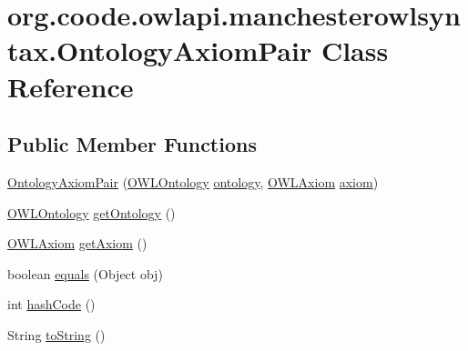 \hypertarget{classorg_1_1coode_1_1owlapi_1_1manchesterowlsyntax_1_1_ontology_axiom_pair}{\section{org.\-coode.\-owlapi.\-manchesterowlsyntax.\-Ontology\-Axiom\-Pair Class Reference}
\label{classorg_1_1coode_1_1owlapi_1_1manchesterowlsyntax_1_1_ontology_axiom_pair}
}
\subsection*{Public Member Functions}
\begin{DoxyCompactItemize}
\item 
\hyperlink{classorg_1_1coode_1_1owlapi_1_1manchesterowlsyntax_1_1_ontology_axiom_pair_af0f8243c91b25e613c98828ea98b0e15}{Ontology\-Axiom\-Pair} (\hyperlink{interfaceorg_1_1semanticweb_1_1owlapi_1_1model_1_1_o_w_l_ontology}{O\-W\-L\-Ontology} \hyperlink{classorg_1_1coode_1_1owlapi_1_1manchesterowlsyntax_1_1_ontology_axiom_pair_ace199db27dc5c7c8914a8433ce7f4bac}{ontology}, \hyperlink{interfaceorg_1_1semanticweb_1_1owlapi_1_1model_1_1_o_w_l_axiom}{O\-W\-L\-Axiom} \hyperlink{classorg_1_1coode_1_1owlapi_1_1manchesterowlsyntax_1_1_ontology_axiom_pair_a713e1a9f34ce9fc446078c4ecb938e6b}{axiom})
\item 
\hyperlink{interfaceorg_1_1semanticweb_1_1owlapi_1_1model_1_1_o_w_l_ontology}{O\-W\-L\-Ontology} \hyperlink{classorg_1_1coode_1_1owlapi_1_1manchesterowlsyntax_1_1_ontology_axiom_pair_a974cdad839c1d50b4488393dc1934e24}{get\-Ontology} ()
\item 
\hyperlink{interfaceorg_1_1semanticweb_1_1owlapi_1_1model_1_1_o_w_l_axiom}{O\-W\-L\-Axiom} \hyperlink{classorg_1_1coode_1_1owlapi_1_1manchesterowlsyntax_1_1_ontology_axiom_pair_ad641bbf7f5606a53c153dd0f2a9ff92c}{get\-Axiom} ()
\item 
boolean \hyperlink{classorg_1_1coode_1_1owlapi_1_1manchesterowlsyntax_1_1_ontology_axiom_pair_a36162fa272a2d88d5df22ef7f0dda908}{equals} (Object obj)
\item 
int \hyperlink{classorg_1_1coode_1_1owlapi_1_1manchesterowlsyntax_1_1_ontology_axiom_pair_a774cca44e5c3c71e5319557c1405c071}{hash\-Code} ()
\item 
String \hyperlink{classorg_1_1coode_1_1owlapi_1_1manchesterowlsyntax_1_1_ontology_axiom_pair_a40b6656a24585307753fbd3294f6b44f}{to\-String} ()
\end{DoxyCompactItemize}
